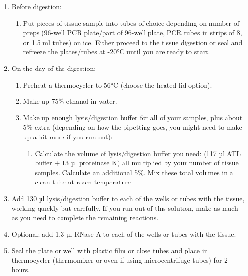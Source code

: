 \documentclass[
  letterpaper,
  DIV=11,
  numbers=noendperiod]{scrreprt}
\providecommand{\tightlist}{%
  \setlength{\itemsep}{0pt}\setlength{\parskip}{0pt}}\usepackage{longtable,booktabs,array}
\begin{document}
\begin{enumerate}
\def\labelenumi{\arabic{enumi}.}
\item
  Before digestion:

  \begin{enumerate}
  \def\labelenumii{\alph{enumii}.}
  \tightlist
  \item
    Put pieces of tissue sample into tubes of choice depending on number
    of preps (96-well PCR plate/part of 96-well plate, PCR tubes in
    strips of 8, or 1.5 ml tubes) on ice. Either proceed to the tissue
    digestion or seal and refreeze the plates/tubes at -20°C until you
    are ready to start.
  \end{enumerate}
\item
  On the day of the digestion:

  \begin{enumerate}
  \def\labelenumii{\alph{enumii}.}
  \item
    Preheat a thermocycler to 56°C (choose the heated lid option).
  \item
    Make up 75\% ethanol in water.
  \item
    Make up enough lysis/digestion buffer for all of your samples, plus
    about 5\% extra (depending on how the pipetting goes, you might need
    to make up a bit more if you run out):

    \begin{enumerate}
    \def\labelenumiii{\roman{enumiii}.}
    \tightlist
    \item
      Calculate the volume of lysis/digestion buffer you need: (117 µl
      ATL buffer + 13 µl proteinase K) all multiplied by your number of
      tissue samples. Calculate an additional 5\%. Mix these total
      volumes in a clean tube at room temperature.
    \end{enumerate}
  \end{enumerate}
\item
  Add 130 µl lysis/digestion buffer to each of the wells or tubes with
  the tissue, working quickly but carefully. If you run out of this
  solution, make as much as you need to complete the remaining
  reactions.
\item
  Optional: add 1.3 µl RNase A to each of the wells or tubes with the
  tissue.
\item
  Seal the plate or well with plastic film or close tubes and place in
  thermocycler (thermomixer or oven if using microcentrifuge tubes) for
  2 hours.

  \begin{tcolorbox}[enhanced jigsaw, rightrule=.15mm, title=\textcolor{quarto-callout-warning-color}{\faExclamationTriangle}\hspace{0.5em}{NOTE}, titlerule=0mm, opacitybacktitle=0.6, toprule=.15mm, bottomrule=.15mm, opacityback=0, left=2mm, colframe=quarto-callout-warning-color-frame, breakable, coltitle=black, colback=white, colbacktitle=quarto-callout-warning-color!10!white, bottomtitle=1mm, leftrule=.75mm, toptitle=1mm, arc=.35mm]


\end{tcolorbox}
\end{enumerate}
\end{document}
